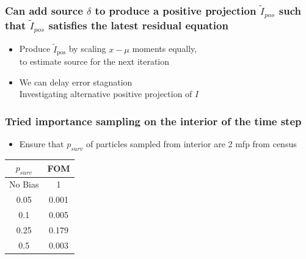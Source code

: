 \documentclass[xcolor=dvipsnames,hyperref={pdfpagelabels=false},unknownkeysallowed]{beamer}
\newcommand{\colb}[1]{{\color{blue} #1}}
\newcommand{\colG}[1]{{\color{Gray!110} #1}}
\newlength{\wideitemsep}
\let\olditem\item
\renewcommand{\item}{\setlength{\itemsep}{\wideitemsep}\olditem}
\newcommand{\B}[1]{\ensuremath{\mathbf{#1}}}
\begin{document}
\begin{frame}
    \frametitle{Can add source $\delta$ to produce a positive projection $\tilde I_{pos}$ 
        such that $\tilde I_{pos}$ satisfies the
    latest residual equation}
    {\addtolength\wideitemsep{0.1in}
    \begin{itemize} 
        \item[] Produce $\tilde I_{\text{pos}}$ by scaling $x-\mu$ moments equally,
            \\ \colG{to estimate source for the next iteration\vspace{0.1in}}
        \item[] We can delay error stagnation
            \\ \colG{Investigating alternative positive projection of $I$}
    \end{itemize}
}
\end{frame}

\begin{frame}
    \frametitle{Tried importance sampling on the interior of the time step}
    \begin{itemize}
        \item[] Ensure that $p_{surv}$ of particles sampled from
            interior are 2 mfp from census
    \end{itemize}
\begin{table}[H]
\centering
\vspace{-0.1in}
\begin{tabular}{|cc|} \hline
        $p_{surv}$ & {FOM} \\ \hline
       No Bias & 1 \\ 
       0.05    & 0.001 \\
       0.1     & 0.005 \\
       0.25    & 0.179  \\
       0.5     & 0.003 \\ \hline
\end{tabular}
\end{table}

\end{frame}
\end{document}
